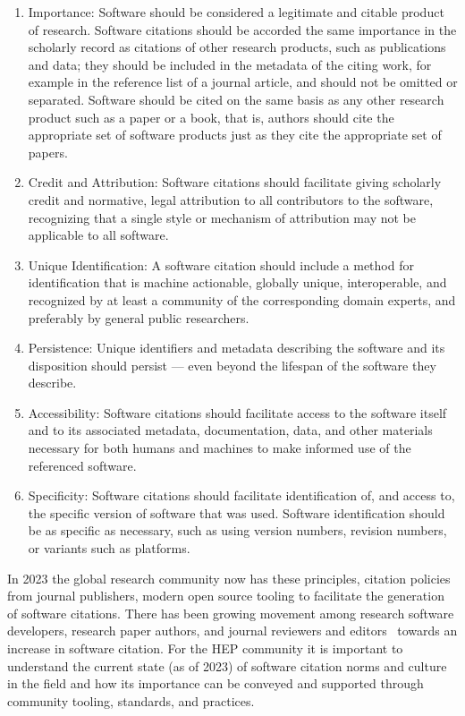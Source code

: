 \begin{enumerate}
    \item Importance: Software should be considered a legitimate and citable product of research.
Software citations should be accorded the same importance in the scholarly record as citations of other research products, such as publications and data; they should be included in the metadata of the citing work, for example in the reference list of a journal article, and should not be omitted or separated.
Software should be cited on the same basis as any other research product such as a paper or a book, that is, authors should cite the appropriate set of software products just as they cite the appropriate set of papers.
    \item Credit and Attribution: Software citations should facilitate giving scholarly credit and normative, legal attribution to all contributors to the software, recognizing that a single style or mechanism of attribution may not be applicable to all software.
    \item Unique Identification: A software citation should include a method for identification that is machine actionable, globally unique, interoperable, and recognized by at least a community of the corresponding domain experts, and preferably by general public researchers.
    \item Persistence: Unique identifiers and metadata describing the software and its disposition should persist --- even beyond the lifespan of the software they describe.
    \item Accessibility: Software citations should facilitate access to the software itself and to its associated metadata, documentation, data, and other materials necessary for both humans and machines to make informed use of the referenced software.
    \item Specificity: Software citations should facilitate identification of, and access to, the specific version of software that was used.
Software identification should be as specific as necessary, such as using version numbers, revision numbers, or variants such as platforms.
\end{enumerate}

In 2023 the global research community now has these principles, citation policies from journal publishers, modern open source tooling to facilitate the generation of software citations.
There has been growing movement among research software developers, research paper authors, and journal reviewers and editors~\cite{smith_journal_2018} towards an increase in software citation.
For the HEP community it is important to understand the current state (as of 2023) of software citation norms and culture in the field and how its importance can be conveyed and supported through community tooling, standards, and practices.

